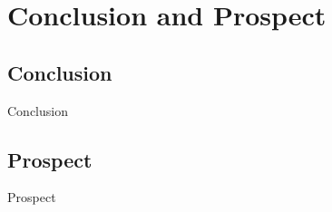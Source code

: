 \section{Conclusion and Prospect}
\subsection{Conclusion}
\begin{frame}{Conclusion}
    
\end{frame}

\subsection{Prospect}
\begin{frame}{Prospect}
    
\end{frame}